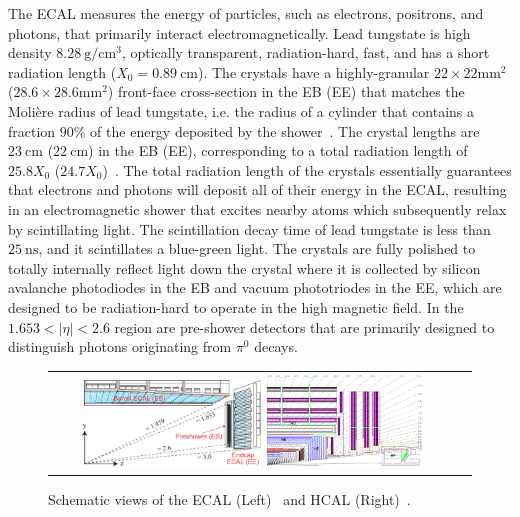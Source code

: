 The ECAL measures the energy of particles, such as electrons, positrons, and photons, that primarily interact electromagnetically.
Lead tungstate is high density $\SI{8.28}{\g\per\cm\cubed}$, optically transparent, radiation-hard, fast, and has a short radiation length ($X_0 = \SI{0.89}{\cm}$).
The crystals have a highly-granular $22 \times 22 \si{\mm\squared}$ ($28.6 \times 28.6 \si{\mm\squared}$) front-face cross-section in the EB (EE) that matches the Molière radius of lead tungstate, i.e. the radius of a cylinder that contains a fraction $90 \%$ of the energy deposited by the shower~\cite{Chatrchyan:1129810}.
The crystal lengths are $\SI{23}{\cm}$ ($\SI{22}{\cm}$) in the EB (EE), corresponding to a total radiation length of $25.8X_0$ ($24.7X_0$)~\cite{Chatrchyan:1129810}.
The total radiation length of the crystals essentially guarantees that electrons and photons will deposit all of their energy in the ECAL, resulting in an electromagnetic shower that excites nearby atoms which subsequently relax by scintillating light.
The scintillation decay time of lead tungstate is less than $\SI{25}{\ns}$, and it scintillates a blue-green light.
The crystals are fully polished to totally internally reflect light down the crystal where it is collected by silicon avalanche photodiodes in the EB and vacuum phototriodes in the EE, which are designed to be radiation-hard to operate in the high magnetic field.
In the $1.653 < \vert \eta \vert < 2.6$ region are pre-shower detectors that are primarily designed to distinguish photons originating from $\pi^0$ decays.

\begin{figure}[htb]
  \begin{center}
    \begin{tabular}{cc}
        \includegraphics[width=0.45\textwidth]{fig_LHC_CMS/ECAL.pdf}
        \includegraphics[width=0.40\textwidth]{fig_LHC_CMS/HCAL.png}
    \end{tabular}
    \caption{Schematic views of the ECAL (Left)~\cite{Bayatian:922757} and HCAL (Right)~\cite{Chatrchyan:1129810}.
            }
    \label{ECAL_HCAL}
  \end{center}
\end{figure}

